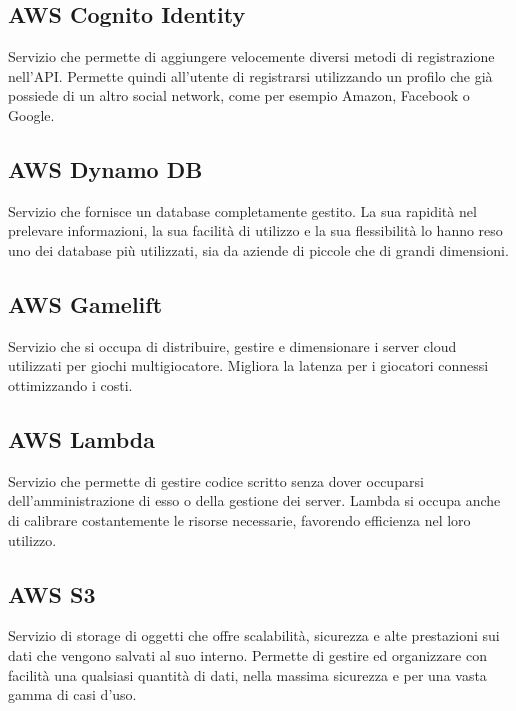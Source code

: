 \subsection*{AWS Cognito Identity}
Servizio  che permette di aggiungere velocemente diversi metodi di registrazione nell'API. Permette quindi all'utente di registrarsi utilizzando un profilo che già possiede di un altro social network, come per esempio Amazon, Facebook o Google. 

\subsection*{AWS Dynamo DB}
Servizio  che fornisce un database  completamente gestito. La sua rapidità nel prelevare informazioni, la sua facilità di utilizzo e la sua flessibilità lo hanno reso uno dei database più utilizzati, sia da aziende di piccole che di grandi dimensioni. 

\subsection*{AWS Gamelift}
Servizio  che si occupa di distribuire, gestire e dimensionare i server cloud utilizzati per giochi multigiocatore. Migliora la latenza per i giocatori connessi ottimizzando i costi.

\subsection*{AWS Lambda}
Servizio  che permette di gestire codice scritto senza dover occuparsi dell'amministrazione di esso o della gestione dei server. Lambda si occupa anche di calibrare costantemente le risorse necessarie, favorendo efficienza nel loro utilizzo. 

\subsection*{AWS S3}
Servizio  di storage di oggetti che offre scalabilità, sicurezza e alte prestazioni sui dati che vengono salvati al suo interno. Permette di gestire ed organizzare con facilità una qualsiasi quantità di dati, nella massima sicurezza e per una vasta gamma di casi d'uso.
